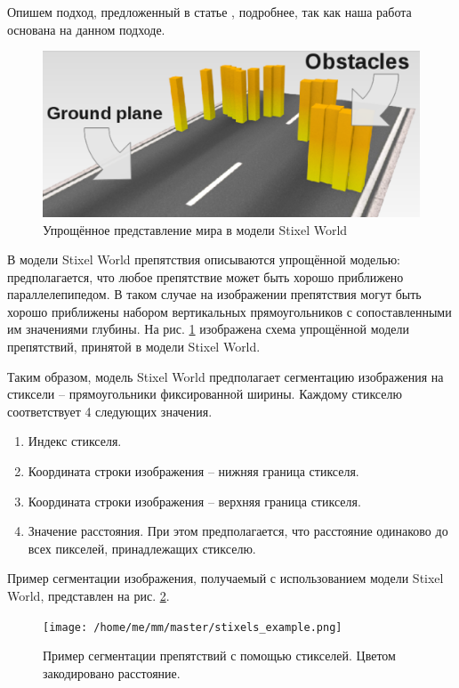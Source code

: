 \documentclass[aps,%
14pt,%
final,%
oneside,
onecolumn,%
musixtex, %
superscriptaddress,%
centertags]{extarticle} %
\begin{document}
Опишем подход, предложенный в статье \cite{pfeiffer2010efficient}, подробнее, так как наша работа основана на данном подходе.


\begin{figure}[htp]
\centering
\includegraphics[width=\textwidth]{stixels_basic.png}
\caption{Упрощённое представление мира в модели Stixel World \cite{benenson2011stixels}}
\label{stixels_basic}
\end{figure}

В модели Stixel World препятствия описываются упрощённой моделью: предполагается, что любое препятствие может быть хорошо приближено параллелепипедом. В таком случае на изображении препятствия могут быть хорошо приближены набором вертикальных прямоугольников с сопоставленными им значениями глубины. На рис. \ref{stixels_basic} изображена схема упрощённой модели препятствий, принятой в модели Stixel World.

Таким образом, модель Stixel World предполагает сегментацию изображения на стиксели -- прямоугольники фиксированной ширины. Каждому стикселю соответствует 4 следующих значения.
\begin{enumerate}
\item Индекс стикселя.
\item Координата строки изображения -- нижняя граница стикселя. 
\item Координата строки изображения -- верхняя граница стикселя.
\item Значение расстояния. При этом предполагается, что расстояние одинаково до всех пикселей, принадлежащих стикселю.
\end{enumerate}

Пример сегментации изображения, получаемый с использованием модели Stixel World, представлен на рис. \ref{stixels_segm}.

\begin{figure}[htp]
\centering
\texttt{[image: /home/me/mm/master/stixels\_example.png]}
\caption{Пример сегментации препятствий с помощью стикселей. Цветом закодировано расстояние.}
\label{stixels_segm}
\end{figure}
\end{document}
